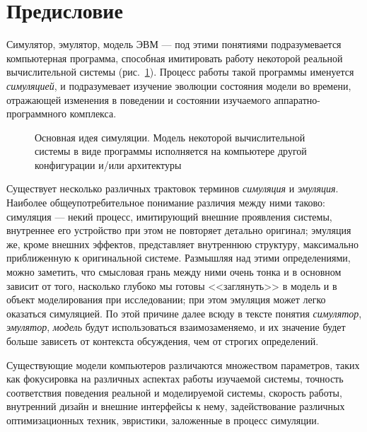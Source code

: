 \chapter*{Предисловие}\label{overview}



Симулятор, эмулятор, модель ЭВМ --- под этими понятиями подразумевается компьютерная программа, способная имитировать работу некоторой реальной вычислительной системы (рис.~\ref{fig:idea}). Процесс работы такой программы именуется \textit{симуляцией}, и подразумевает изучение эволюции состояния модели во времени, отражающей изменения в поведении и состоянии изучаемого аппаратно-программного комплекса.


\setcounter{chapter}{1} %
\setcounter{figure}{-1}
\begin{figure}[tp]
    \centering
    \caption[Основная идея симуляции]{Основная идея симуляции. Модель некоторой вычислительной системы в виде программы исполняется на компьютере другой конфигурации и/или архитектуры}
    \label{fig:idea}
\end{figure}
\setcounter{chapter}{0} %
\setcounter{figure}{0}

Существует несколько различных трактовок терминов \textit{симуляция} и \textit{эмуляция}. Наиболее общеупотребительное понимание различия между ними таково: симуляция --- некий процесс, имитирующий внешние проявления системы, внутреннее его устройство при этом не повторяет детально оригинал; эмуляция же, кроме внешних эффектов, представляет внутреннюю структуру, максимально приближенную к оригинальной системе. Размышляя над этими определениями, можно заметить, что смысловая грань между ними очень тонка и в основном зависит от того, насколько глубоко мы готовы <<заглянуть>> в модель и в объект моделирования при исследовании; при этом эмуляция может легко оказаться симуляцией. По этой причине далее всюду в тексте понятия \textit{симулятор}, \textit{эмулятор}, \textit{модель} будут использоваться взаимозаменяемо, и их значение будет больше зависеть от контекста обсуждения, чем от строгих определений.

Существующие модели компьютеров различаются множеством параметров, таких как фокусировка на различных аспектах работы изучаемой системы, точность соответствия поведения реальной и моделируемой системы, скорость работы, внутренний дизайн и внешние интерфейсы к нему, задействование различных оптимизационных техник, эвристики, заложенные в процесс симуляции.

